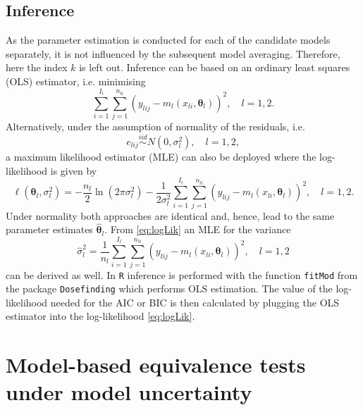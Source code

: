 {\subsection{Inference} \label{sec:MA:inference}
As the parameter estimation is conducted for each of the candidate models separately, it is not influenced by the subsequent model averaging. Therefore, here the index $k$ is left out. 
Inference can be based on an ordinary least squares (OLS) estimator, i.e. minimising 
$$
\sum_{i=1}^{I_l} \sum_{j=1}^{n_{li}} (y_{lij} - m_{l}(x_{li}, \boldsymbol{\theta}_{l}))^2, \quad l=1,2.
$$ 
Alternatively, under the assumption of normality of the residuals, i.e.
$$e_{lij} \stackrel{iid}{\sim} N(0, \sigma^2_{l}), \quad l=1,2,$$
a maximum likelihood estimator (MLE) can also be deployed where the log-likelihood is given by
\begin{equation} \label{eq:logLik}
   \ell(\boldsymbol{\theta}_{l}, \sigma_l^2    ) = -\frac{n_l}{2} \ln(2\pi\sigma_l^2) - \frac{1}{2\sigma_l^2} \sum_{i=1}^{I_l} \sum_{j=1}^{n_{li}} (y_{lij} - m_{l}(x_{li}, \boldsymbol{\theta}_{l}))^2, \quad l=1,2. 
\end{equation}
Under normality both approaches are identical and, hence, lead to the same parameter estimates $\hat{\boldsymbol{\theta}}_{l}$. From \eqref{eq:logLik} an MLE for the variance 
\begin{equation} \label{eq:var}
\hat{\sigma}_l^2 = \frac{1}{n_l} \sum_{i=1}^{I_l} \sum_{j=1}^{n_{li}} (y_{lij} - m_{l}(x_{li}, \boldsymbol{\theta}_{l}))^2, \quad l=1,2
\end{equation}
can be derived as well. 
In \texttt{R} inference is performed with the function \texttt{fitMod} from the package \texttt{Dosefinding} \citep{Bornkamp2009, Pinheiro2014} which performs OLS estimation. The value of the log-likelihood needed for the AIC or BIC is then calculated by plugging the OLS estimator into the log-likelihood \eqref{eq:logLik}. 

\section{Model-based equivalence tests under model uncertainty} \label{sec:EquiTest}

}
